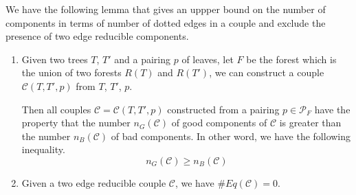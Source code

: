 We have the following lemma that gives an uppper bound on the number of components in terms of number of dotted edges in a couple and exclude the presence of two edge reducible components.


\begin{lem} 

    \begin{enumerate}
        \item Given two trees $T$, $T'$ and a pairing $p$ of leaves, let $F$ be the forest which is the union of two forests $R(T)$ and $R(T')$, we can construct a couple $\mathcal{C}(T,T',p)$ from $T$, $T'$, $p$.
        
        Then all couples $\mathcal{C} = \mathcal{C}(T,T',p)$ constructed from a pairing $p\in \mathcal{P}_F$ have the property that the number $n_{G}(\mathcal{C})$ of good components of $\mathcal{C}$ is greater than the number $n_{B}(\mathcal{C})$ of bad components. In other word, we have the following inequality.
        \begin{equation}
            n_{G}(\mathcal{C})\ge n_{B}(\mathcal{C})
        \end{equation}

        \item Given a two edge reducible couple $\mathcal{C}$, we have $\# Eq(\mathcal{C}) = 0$.
    \end{enumerate}
\end{lem}
